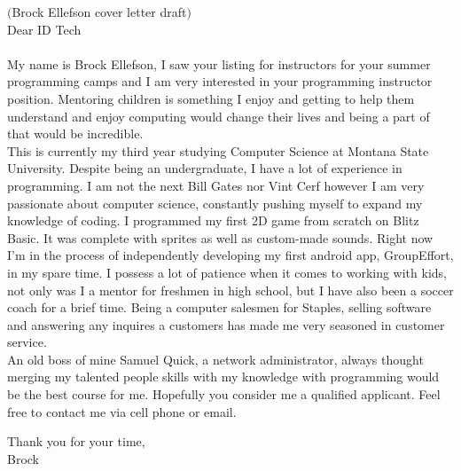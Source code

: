 \documentclass[a4paper,12pt]{letter}
\author{Brock Ellefson} %
\begin{document}
$($Brock Ellefson cover letter draft$)$\\

Dear ID Tech\\\\
My name is Brock Ellefson, I saw your listing for instructors for your summer programming camps and I am very interested in your  programming instructor position. Mentoring children is something I enjoy and getting to help them understand and enjoy computing would change their lives and being a part of that would be incredible. \\ 


This is currently my third year studying Computer Science at Montana State University. Despite being an undergraduate, I have a lot of experience in programming. I am not the next Bill Gates nor Vint Cerf however I am very passionate about computer science, constantly pushing myself to expand my knowledge of coding. I programmed my first 2D game from scratch on Blitz Basic. It was complete with sprites as well as custom-made sounds. Right now I'm in the process of independently developing my first android app, GroupEffort, in my spare time. I possess a lot of patience when it comes to working with kids, not only was I a mentor for freshmen in high school, but I have also been a soccer coach for a brief time. Being a computer salesmen for Staples, selling software and answering any inquires a customers has made me very seasoned in customer service.\\   

An old boss of mine Samuel Quick, a network administrator, always thought merging my talented people skills with my knowledge with programming would be the best course for me. Hopefully you consider me a qualified applicant. Feel free to contact me via cell phone or email.

Thank you for your time, \\
Brock
\end{document}
